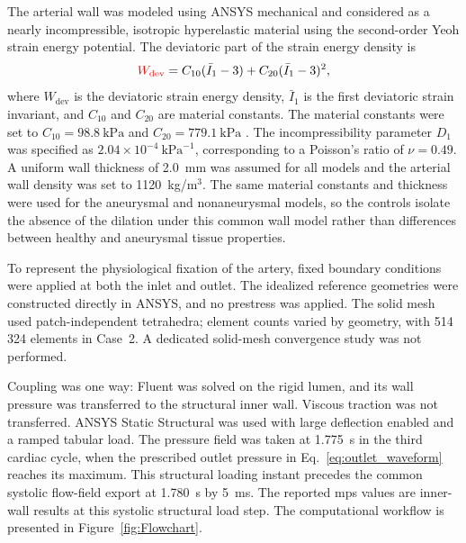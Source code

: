 \documentclass[12pt,a4paper]{article}
\newcommand{\cfdrevision}[1]{#1} %
\newcommand{\FSI}{\ac{fsi}\xspace}
\newcommand{\MPS}{\ac{mps}\xspace}
\theoremstyle{definition}
\numberwithin{equation}{section}
\providecommand{\DIFaddtex}[1]{{\protect\color{blue} \sf #1}} %
\providecommand{\DIFdeltex}[1]{{\protect\color{red} \scriptsize #1}} %
\providecommand{\DIFaddbegin}{} %
\providecommand{\DIFaddend}{} %
\providecommand{\DIFdelbegin}{} %
\providecommand{\DIFdelend}{} %
\providecommand{\DIFadd}[1]{\texorpdfstring{\DIFaddtex{#1}}{#1}} %
\providecommand{\DIFdel}[1]{\texorpdfstring{\DIFdeltex{#1}}{}} %
\newcommand{\DIFscaledelfig}{0.5}
\newlength{\DIFdelgraphicswidth} %
\newlength{\DIFdelgraphicsheight} %
\newcommand{\DIFaddincludegraphics}[2][]{{\color{blue}\fbox{\DIFOincludegraphics[#1]{#2}}}} %
\newcommand{\DIFdelincludegraphics}[2][]{%
\sbox{\DIFdelgraphicsbox}{\DIFOincludegraphics[#1]{#2}}%
\settoboxwidth{\DIFdelgraphicswidth}{\DIFdelgraphicsbox} %
\settoboxtotalheight{\DIFdelgraphicsheight}{\DIFdelgraphicsbox} %
\scalebox{\DIFscaledelfig}{%
\parbox[b]{\DIFdelgraphicswidth}{\usebox{\DIFdelgraphicsbox}\\[-\baselineskip] \rule{\DIFdelgraphicswidth}{0em}}\llap{\resizebox{\DIFdelgraphicswidth}{\DIFdelgraphicsheight}{%
\setlength{\unitlength}{\DIFdelgraphicswidth}%
\begin{picture}(1,1)%
\thicklines\linethickness{2pt} %
{\color[rgb]{1,0,0}\put(0,0){\framebox(1,1){}}}%
{\color[rgb]{1,0,0}\put(0,0){\line( 1,1){1}}}%
{\color[rgb]{1,0,0}\put(0,1){\line(1,-1){1}}}%
\end{picture}%
}\hspace*{3pt}}} %
} %
\DeclareRobustCommand{\DIFaddbegin}{\DIFOaddbegin \let\includegraphics\DIFaddincludegraphics} %
\DeclareRobustCommand{\DIFaddend}{\DIFOaddend \let\includegraphics\DIFOincludegraphics} %
\DeclareRobustCommand{\DIFdelbegin}{\DIFOdelbegin \let\includegraphics\DIFdelincludegraphics} %
\DeclareRobustCommand{\DIFdelend}{\DIFOaddend \let\includegraphics\DIFOincludegraphics} %
\renewcommand{\DIFaddtex}[1]{{\protect\color{red}#1}}
\renewcommand{\DIFdeltex}[1]{}
\renewcommand{\DIFdel}[1]{}
\renewcommand{\DIFaddincludegraphics}[2][]{\DIFOincludegraphics[#1]{#2}}
\renewcommand{\DIFdelincludegraphics}[2][]{}
\renewcommand{\cfdrevision}[1]{\textcolor{red}{#1}}
\def\DIFaddbegin{}\def\DIFaddend{}%
\def\DIFdelbegin{}\def\DIFdelend{}%
\def\cfdrevision#1{#1}%
\begin{document}
The arterial wall was modeled using ANSYS mechanical and considered as a nearly incompressible, isotropic hyperelastic material using the second-order Yeoh strain energy potential. \DIFdelbegin \DIFdel{The strain energy density function is
}%
\DIFdelend \DIFaddbegin \DIFadd{\cfdrevision{The deviatoric part of the strain energy density is}
}\begin{equation}
\textcolor{red}{W_{\mathrm{dev}}} = C_{10}(\bar{I}_1 - 3) + C_{20}(\bar{I}_1 - 3)^2,
\label{eq:yeoh}
\end{equation}\DIFaddend 
where \DIFdelbegin \DIFdel{\(W\) is the strain energy density}\DIFdelend \DIFaddbegin \DIFadd{\cfdrevision{\(W_{\mathrm{dev}}\) is the deviatoric strain energy density}}\DIFaddend , \(\bar{I}_1\) is the first deviatoric strain invariant, and \(C_{10}\) and \(C_{20}\) are material constants. The material constants were set to \(C_{10} = 98.8~\text{kPa}\) and \(C_{20} = 779.1~\text{kPa}\) \cite{zhu2025combined}. The incompressibility parameter \(D_1\) was specified as \(2.04 \times 10^{-4}~\text{kPa}^{-1}\), corresponding to a Poisson's ratio of \(\nu = 0.49\). A uniform wall thickness of 2.0~mm was assumed for all models and the arterial wall density was set to 1120~kg/m\(^3\). \DIFaddbegin \DIFadd{\cfdrevision{The same material constants and thickness were used for the aneurysmal and nonaneurysmal models, so the controls isolate the absence of the dilation under this common wall model rather than differences between healthy and aneurysmal tissue properties.}
}\DIFaddend 

To represent the physiological fixation of the artery, fixed boundary conditions were applied at both the inlet and outlet. \DIFdelbegin \DIFdel{The }%
\DIFdel{interface was defined on the inner surface of the arterial wall, and a one-way }%
\DIFdel{coupling was used, in which the wall tractions from the flow solution are mapped onto the structural model. The }\DIFdelend \DIFaddbegin \DIFadd{\cfdrevision{The idealized reference geometries were constructed directly in ANSYS, and no prestress was applied. The solid mesh used patch-independent tetrahedra; element counts varied by geometry, with 514\,324 elements in Case~2. A dedicated solid-mesh convergence study was not performed.}
}

\DIFadd{\cfdrevision{Coupling was one way: Fluent was solved on the rigid lumen, and its wall pressure was transferred to the structural inner wall. Viscous traction was not transferred. ANSYS Static Structural was used with large deflection enabled and a ramped tabular load. The pressure field was taken at 1.775~s in the third cardiac cycle, when the prescribed outlet pressure in Eq.~\eqref{eq:outlet_waveform} reaches its maximum. This structural loading instant precedes the common systolic flow-field export at 1.780~s by 5~ms. The reported \MPS values are inner-wall results at this systolic structural load step.} The }\DIFaddend computational workflow is presented in Figure~\ref{fig:Flowchart}.
\end{document}
